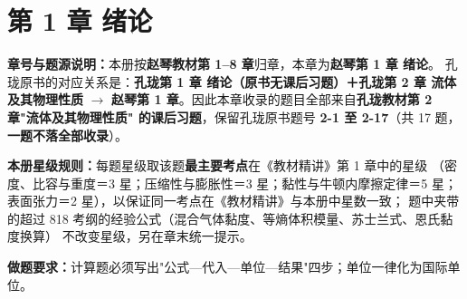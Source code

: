 \chapter*{第 1 章 绪论}

\begin{tishi}
\textbf{章号与题源说明：}本册按\textbf{赵琴教材第 1--8 章}归章，本章为\textbf{赵琴第 1 章 绪论}。
孔珑原书的对应关系是：\textbf{孔珑第 1 章 绪论（原书无课后习题）＋孔珑第 2 章 流体及其物理性质}
$\to$ \textbf{赵琴第 1 章}。因此本章收录的题目全部来自\textbf{孔珑教材第 2 章"流体及其物理性质"
的课后习题}，保留孔珑原书题号 \textbf{2-1 至 2-17}（共 17 题，\textbf{一题不落全部收录}）。

\textbf{本册星级规则：}每题星级取该题\textbf{最主要考点}在《教材精讲》第 1 章中的星级
（密度、比容与重度＝3 星；压缩性与膨胀性＝3 星；黏性与牛顿内摩擦定律＝5 星；
表面张力＝2 星），以保证同一考点在《教材精讲》与本册中星数一致；
题中夹带的超过 818 考纲的经验公式（混合气体黏度、等熵体积模量、苏士兰式、恩氏黏度换算）
不改变星级，另在章末统一提示。

\textbf{做题要求：}计算题必须写出"公式—代入—单位—结果"四步；单位一律化为国际单位。
\end{tishi}

